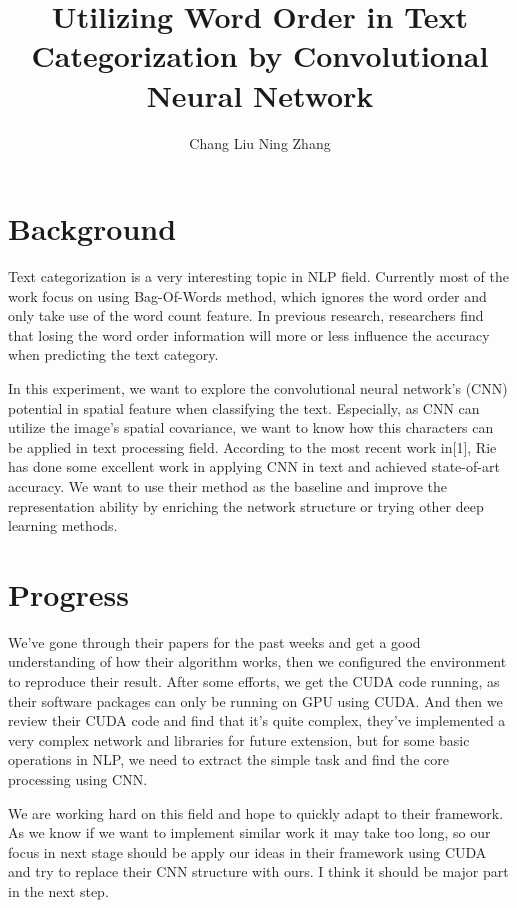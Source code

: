 \documentclass{article}
\title{Utilizing Word Order in Text Categorization by Convolutional Neural Network}
\author{Chang Liu \space Ning Zhang}
\begin{document}
\maketitle

\section{Background}

Text categorization is a very interesting topic in NLP field. Currently most of the work focus on using Bag-Of-Words method, which ignores the word order and only take use of the word count feature. In previous research, researchers find that losing the word order information will more or less influence the accuracy when predicting the text category.

In this experiment, we want to explore the convolutional neural network's (CNN) potential in spatial feature when classifying the text. Especially, as CNN can utilize the image's spatial covariance, we want to know how this characters can be applied in text processing field. According to the most recent work in[1], Rie has done some excellent work in applying CNN in text and achieved state-of-art accuracy. We want to use their method as the baseline and improve the representation ability by enriching the network structure or trying other deep learning methods.

\section{Progress}

We've gone through their papers for the past weeks and get a good understanding of how their algorithm works, then we configured the environment to reproduce their result. After some efforts, we get the CUDA code running, as their software packages can only be running on GPU using CUDA. And then we review their CUDA code and find that it's quite complex, they've implemented a very complex network and libraries for future extension, but for some basic operations in NLP, we need to extract the simple task and find the core processing using CNN.

We are working hard on this field and hope to quickly adapt to their framework. As we know if we want to implement similar work it may take too long, so our focus in next stage should be apply our ideas in their framework using CUDA and try to replace their CNN structure with ours. I think it should be major part in the next step.
\end{document}
